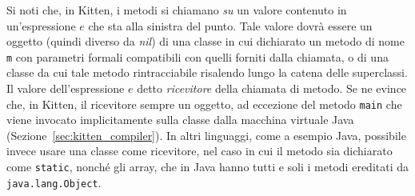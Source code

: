 Si noti che, in Kitten, i metodi si chiamano \emph{su} un valore contenuto
in un'espressione $e$ che sta alla sinistra del punto. Tale valore dovr\`a
essere un oggetto (quindi diverso da \textit{nil}) di una classe in cui
\e dichiarato un metodo di nome \texttt{m} con parametri formali compatibili
con quelli forniti dalla chiamata, o di una classe da cui tale
metodo \e rintracciabile risalendo lungo la catena delle superclassi.
Il valore dell'espressione $e$ \e detto
\emph{ricevitore} della chiamata di metodo. Se ne evince che, in Kitten,
il ricevitore \e sempre un oggetto, ad eccezione del metodo \texttt{main}
che viene invocato implicitamente sulla classe dalla macchina virtuale
Java (Sezione~\ref{sec:kitten_compiler}).
In altri linguaggi, come a esempio Java, \e possibile
invece usare una classe come ricevitore, nel caso in cui il metodo sia
dichiarato come \texttt{static}, nonch\'e gli array, che in Java
hanno tutti e soli i metodi ereditati da \texttt{java.lang.Object}.

